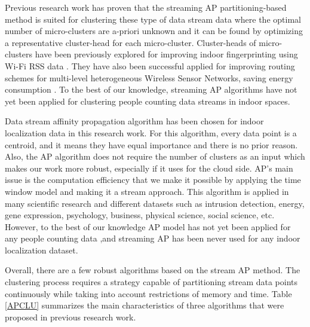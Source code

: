 
Previous research work has proven that the streaming AP partitioning-based method is suited for clustering these type of data stream data where the optimal number of micro-clusters are a-priori unknown and it can be found by optimizing a representative cluster-head for each micro-cluster. Cluster-heads of micro-clusters have been previously explored for improving indoor fingerprinting using Wi-Fi RSS data \cite{hu2015improving, subedi2019improving}. They have also been successful applied for improving routing schemes for multi-level heterogeneous Wireless Sensor Networks, saving energy consumption \cite{wang2019affinity}. To  the  best  of  our  knowledge,  streaming AP algorithms have  not  yet  been  applied for clustering people counting data streams in indoor spaces.

Data stream affinity propagation algorithm has been chosen for indoor localization data in this research work. For this algorithm, every data point is a centroid, and it means they have equal importance and there is no prior reason. Also, the AP algorithm does not require the number of clusters as an input which makes our work more robust, especially if it uses for the cloud side. AP's main issue is the computation efficiency that we make it possible by applying the time window model and making it a stream approach. This algorithm is applied in many scientific research and different datasets such as intrusion detection, energy, gene expression, psychology, business, physical science, social science, etc. However, to the best of our knowledge AP model has not yet been applied for any people counting data ,and streaming AP has been never used for any indoor localization dataset.

Overall, there are a few robust algorithms based on the stream AP method. The clustering process requires a strategy capable of partitioning stream data points continuously while taking into account restrictions of memory and time. Table \ref{APCLU} summarizes the main characteristics of three algorithms that were proposed in previous research work. 



